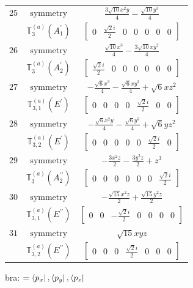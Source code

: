 \documentclass[fleqn,8pt,landscape]{jsarticle}
\begin{document}
\begin{longtable}{ccc}
$ 25 $ & $ \text{symmetry} $ & $ \frac{3 \sqrt{10} x^{2} y}{4} - \frac{\sqrt{10} y^{3}}{4} $ \\
$  $ & $ \mathbb{T}_{3}^{(a)}(A_{1}^{\prime}) $ & $ \begin{bmatrix} 0 & \frac{\sqrt{2} i}{2} & 0 & 0 & 0 & 0 & 0 \end{bmatrix} $ \\ \hline
$ 26 $ & $ \text{symmetry} $ & $ \frac{\sqrt{10} x^{3}}{4} - \frac{3 \sqrt{10} x y^{2}}{4} $ \\
$  $ & $ \mathbb{T}_{3}^{(a)}(A_{2}^{\prime}) $ & $ \begin{bmatrix} \frac{\sqrt{2} i}{2} & 0 & 0 & 0 & 0 & 0 & 0 \end{bmatrix} $ \\ \hline
$ 27 $ & $ \text{symmetry} $ & $ - \frac{\sqrt{6} x^{3}}{4} - \frac{\sqrt{6} x y^{2}}{4} + \sqrt{6} x z^{2} $ \\
$  $ & $ \mathbb{T}_{3,1}^{(a)}(E^{\prime}) $ & $ \begin{bmatrix} 0 & 0 & 0 & 0 & \frac{\sqrt{2} i}{2} & 0 & 0 \end{bmatrix} $ \\ \hline
$ 28 $ & $ \text{symmetry} $ & $ - \frac{\sqrt{6} x^{2} y}{4} - \frac{\sqrt{6} y^{3}}{4} + \sqrt{6} y z^{2} $ \\
$  $ & $ \mathbb{T}_{3,2}^{(a)}(E^{\prime}) $ & $ \begin{bmatrix} 0 & 0 & 0 & 0 & 0 & \frac{\sqrt{2} i}{2} & 0 \end{bmatrix} $ \\ \hline
$ 29 $ & $ \text{symmetry} $ & $ - \frac{3 x^{2} z}{2} - \frac{3 y^{2} z}{2} + z^{3} $ \\
$  $ & $ \mathbb{T}_{3}^{(a)}(A_{2}^{\prime\prime}) $ & $ \begin{bmatrix} 0 & 0 & 0 & 0 & 0 & 0 & \frac{\sqrt{2} i}{2} \end{bmatrix} $ \\ \hline
$ 30 $ & $ \text{symmetry} $ & $ - \frac{\sqrt{15} x^{2} z}{2} + \frac{\sqrt{15} y^{2} z}{2} $ \\
$  $ & $ \mathbb{T}_{3,1}^{(a)}(E^{\prime\prime}) $ & $ \begin{bmatrix} 0 & 0 & - \frac{\sqrt{2} i}{2} & 0 & 0 & 0 & 0 \end{bmatrix} $ \\ \hline
$ 31 $ & $ \text{symmetry} $ & $ \sqrt{15} x y z $ \\
$  $ & $ \mathbb{T}_{3,2}^{(a)}(E^{\prime\prime}) $ & $ \begin{bmatrix} 0 & 0 & 0 & \frac{\sqrt{2} i}{2} & 0 & 0 & 0 \end{bmatrix} $ \\ \hline
\end{longtable}
bra: $=\bra{p_{x}}, \bra{p_{y}}, \bra{p_{z}}$
\end{document}
